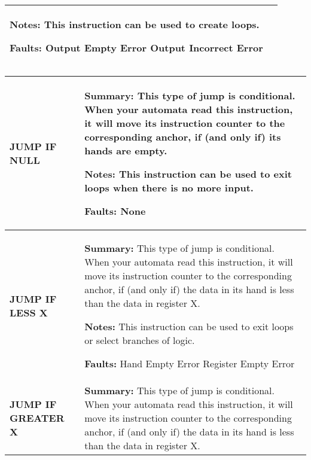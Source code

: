 \begin{center}
\begin{tabular}{ | m{3cm} | m{11cm} | }
            \textbf{Notes:} 
            \newline This instruction can be used to create loops.

            \textbf{Faults:}
            \newline Output Empty Error
            \newline Output Incorrect Error\\ 
        \hline
    \end{tabular}

    \begin{tabular}{ | m{3cm} | m{11cm} | } 
        \hline
            \begin{center}
                \textbf{JUMP IF NULL} 
            \end{center}& 
            \textbf{Summary:} 
            \newline This type of jump is conditional. When your automata read this instruction, it will move its instruction counter 
            to the corresponding anchor, if (and only if) its hands are empty.

            \textbf{Notes:} 
            \newline This instruction can be used to exit loops when there is no more input.

            \textbf{Faults:}
            \newline None\\
        \hline
            \begin{center}
                \textbf{JUMP IF LESS X} 
            \end{center}& 
            \textbf{Summary:} 
            \newline This type of jump is conditional. When your automata read this instruction, it will move its 
            instruction counter to the corresponding anchor, if (and only if) the data in its hand is less than the data in register X.

            \textbf{Notes:} 
            \newline This instruction can be used to exit loops or select branches of logic.

            \textbf{Faults:}
            \newline Hand Empty Error
            \newline Register Empty Error\\
        \hline
            \begin{center}
                \textbf{JUMP IF GREATER X} 
            \end{center}& 
            \textbf{Summary:} 
            \newline This type of jump is conditional. When your automata read this instruction, it will move its instruction counter 
            to the corresponding anchor, if (and only if) the data in its hand is less than the data in register X.


\end{tabular}
\end{center}
